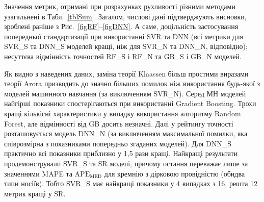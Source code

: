 \documentclass[12pt,a4paper,titlepage,oneside]{book}
\numberwithin{equation}{part}
\begin{document}
Значення метрик, отримані при розрахунках рухливості різними методами узагальнені в Табл.~\ref{tblSum}.
Загалом, числові дані підтверджують висновки, зроблені раніше з Рис.~\ref{figRF}--\ref{figDNN}.
А саме, доцільність застосування попередньої стандартизації при використанні SVR та DNN
(всі метрики для SVR\_S  та DNN\_S моделей кращі, ніж для SVR\_N  та DNN\_N, відповідно);
несуттєва відмінність точностей RF\_S  і RF\_N та  GB\_S  і GB\_N моделей.

Як видно з наведених даних, заміна теорії Klaassen більш простими виразами теорії Arora 
призводить до значно більших помилок ніж використання будь-якої з моделей машинного навчання
(за виключенням SVR\_N).
Серед МН моделей найгірші показники спостерігаються при використанні Gradient Boosting.
Трохи кращі кількісні характеристики у випадку використання алгоритму Random Forest,
але відмінності від GB досить незначні.
Далі у рейтингу точності розташовується модель DNN\_N (за виключенням максимальної помилки, яка співрозмірна з 
показниками попередньо згаданих моделей).
Для DNN\_S практично всі показники приблизно у 1,5 рази кращі.
Найкращі результати продемонстрували SVR\_S та SR моделі, причому остання переважає
лише за значеннями MAPE та $\mathrm{APE}_\mathrm{MED}$ для кремнію з дірковою провідністю
(обидва типи носіїв).
Тобто SVR\_S має найкращі показники у 4 випадках з 16,
решта 12 метрик кращі у SR.
\end{document}
